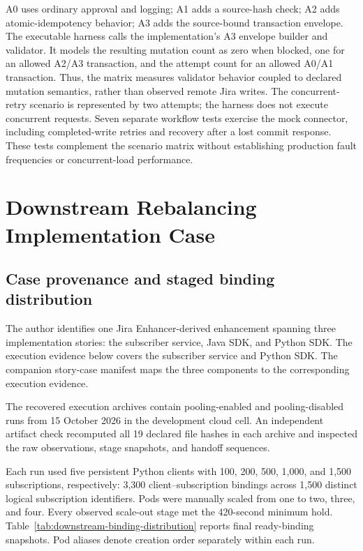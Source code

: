 \documentclass[10pt,a4paper]{article}
\begin{document}
A0 uses ordinary approval and logging; A1 adds a source-hash check; A2 adds atomic-idempotency behavior; A3 adds the source-bound transaction envelope. The executable harness calls the implementation's A3 envelope builder and validator. It models the resulting mutation count as zero when blocked, one for an allowed A2/A3 transaction, and the attempt count for an allowed A0/A1 transaction. Thus, the matrix measures validator behavior coupled to declared mutation semantics, rather than observed remote Jira writes. The concurrent-retry scenario is represented by two attempts; the harness does not execute concurrent requests. Seven separate workflow tests exercise the mock connector, including completed-write retries and recovery after a lost commit response. These tests complement the scenario matrix without establishing production fault frequencies or concurrent-load performance.

\section{Downstream Rebalancing Implementation Case}\label{sec:downstream-rebalancing-case}

\subsection{Case provenance and staged binding distribution}
The author identifies one Jira Enhancer-derived enhancement spanning three implementation stories: the subscriber service, Java SDK, and Python SDK. The execution evidence below covers the subscriber service and Python SDK. The companion story-case manifest maps the three components to the corresponding execution evidence.

The recovered execution archives contain pooling-enabled and pooling-disabled runs from 15 October 2026 in the development cloud cell. An independent artifact check recomputed all 19 declared file hashes in each archive and inspected the raw observations, stage snapshots, and handoff sequences.

Each run used five persistent Python clients with 100, 200, 500, 1,000, and 1,500 subscriptions, respectively: 3,300 client--subscription bindings across 1,500 distinct logical subscription identifiers. Pods were manually scaled from one to two, three, and four. Every observed scale-out stage met the 420-second minimum hold. Table~\ref{tab:downstream-binding-distribution} reports final ready-binding snapshots. Pod aliases denote creation order separately within each run.
\end{document}
